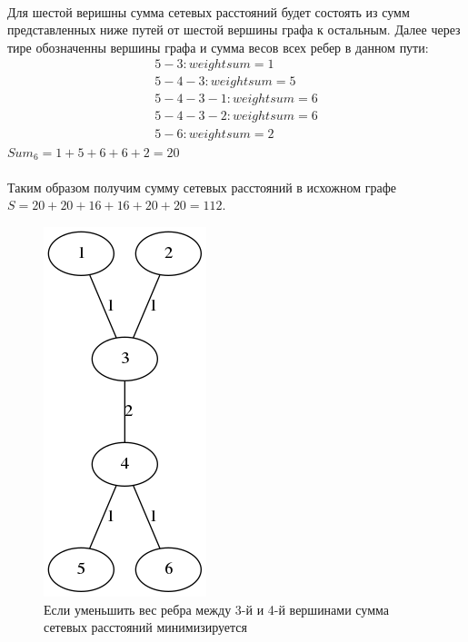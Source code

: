 \documentclass[12pt]{article}
\begin{document}
\paragraph{}

Для шестой веришны сумма сетевых расстояний будет состоять из сумм представленных ниже 
путей от шестой вершины графа к остальным.
Далее через тире обозначенны вершины графа и сумма весов всех ребер в данном пути:
\begin{gather}
5 - 3 : weight sum = 1 \\
5 - 4 - 3 : weight sum = 5 \\
5 - 4 - 3 - 1 : weight sum = 6 \\
5 - 4 - 3 - 2 : weight sum = 6 \\
5 - 6 : weight sum = 2
\end{gather}
$Sum_6 = 1 + 5 + 6 + 6 + 2 = 20$

\paragraph{}

Таким образом получим сумму сетевых расстояний в исхожном графе $S = 20 + 20 + 16 + 16 + 20 + 20 = 112$.

\begin{figure}[h]
    \centering
    \includegraphics[scale=0.7]{min_graph_2.png}
    \caption{Если уменьшить вес ребра между 3-й и 4-й вершинами сумма сетевых расстояний минимизируется}
    \label{fig:min_graph_2}
\end{figure}
\end{document}
